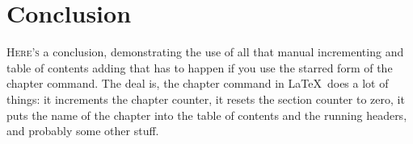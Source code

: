 \chapter*{Conclusion}

\lettrine{H}{ere's} a conclusion, demonstrating the use of all that manual incrementing and table of contents adding that has to happen if you use the starred form of the chapter command. The deal is, the chapter command in \LaTeX\ does a lot of things: it increments the chapter counter, it resets the section counter to zero, it puts the name of the chapter into the table of contents and the running headers, and probably some other stuff. 
